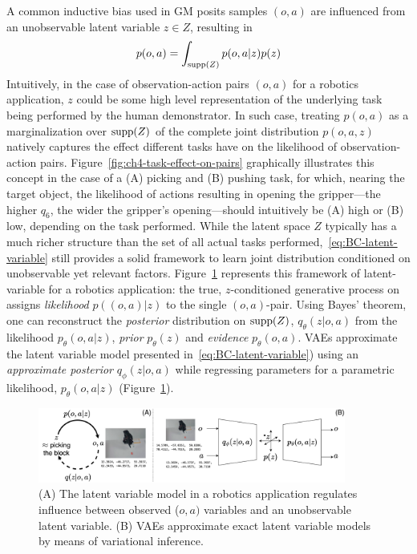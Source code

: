 A common inductive bias used in GM posits samples \( (o,a) \) are influenced from an unobservable latent variable \( z \in Z \), resulting in
\begin{equation}\label{eq:BC-latent-variable}
    p (o,a) = \int_{\text{supp}({Z})} p(o,a \vert z) p(z)
\end{equation}
Intuitively, in the case of observation-action pairs \( (o, a) \) for a robotics application, \( z \) could be some high level representation of the underlying task being performed by the human demonstrator.
In such case, treating \( p(o,a) \) as a marginalization over \( \text{supp}({Z}) \) of the complete joint distribution \( p(o,a,z) \) natively captures the effect different tasks have on the likelihood of observation-action pairs.
Figure~\ref{fig:ch4-task-effect-on-pairs} graphically illustrates this concept in the case of a (A) picking and (B) pushing task, for which, nearing the target object, the likelihood of actions resulting in opening the gripper---the higher \( q_6 \), the wider the gripper's opening---should intuitively be (A) high or (B) low, depending on the task performed.
While the latent space \( Z \) typically has a much richer structure than the set of all actual tasks performed,~\ref{eq:BC-latent-variable} still provides a solid framework to learn joint distribution conditioned on unobservable yet relevant factors.
Figure~\ref{fig:ch4-latent-variable-model} represents this framework of latent-variable for a robotics application: the true, \( z \)-conditioned generative process on assigns \emph{likelihood} \( p((o,a) \vert z) \) to the single \( (o,a) \)-pair.
Using Bayes' theorem, one can reconstruct the \emph{posterior} distribution on \( \text{supp}({Z}) \), \( q_\theta(z \vert o,a) \) from the likelihood \( p_\theta(o,a \vert z) \), \emph{prior} \( p_\theta(z) \) and \emph{evidence} \( p_\theta(o,a) \).
VAEs approximate the latent variable model presented in~\ref{eq:BC-latent-variable}) using an \emph{approximate posterior} \(q_\phi(z \vert o,a) \) while regressing parameters for a parametric likelihood, \( p_\theta(o,a \vert z) \) (Figure~\ref{fig:ch4-latent-variable-model}).

\begin{figure}
    \centering
    \includegraphics[width=0.9\textwidth]{figures/ch4/ch4-latent-variable-model.png}
    \caption{(A) The latent variable model in a robotics application regulates influence between observed (\(o,a) \) variables and an unobservable latent variable. (B) VAEs approximate exact latent variable models by means of variational inference. }
    \label{fig:ch4-latent-variable-model}
\end{figure}

